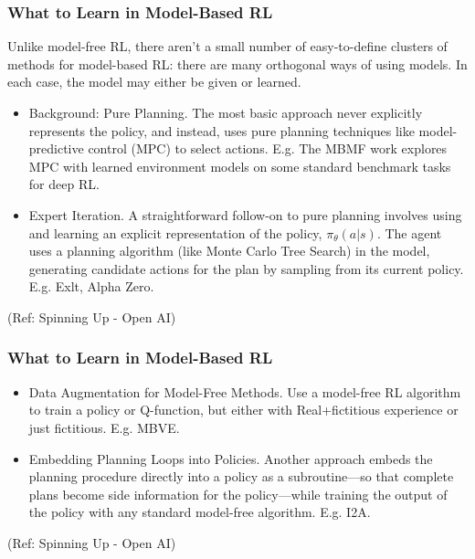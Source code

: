 \begin{frame}[fragile]\frametitle{What to Learn in Model-Based RL}

Unlike model-free RL, there aren't a small number of easy-to-define clusters of methods for model-based RL: there are many orthogonal ways of using models.  In each case, the model may either be given or learned.

\begin{itemize}
\item Background: Pure Planning. The most basic approach never explicitly represents the policy, and instead, uses pure planning techniques like model-predictive control (MPC) to select actions. E.g. The MBMF work explores MPC with learned environment models on some standard benchmark tasks for deep RL.
\item Expert Iteration. A straightforward follow-on to pure planning involves using and learning an explicit representation of the policy, $\pi_{\theta}(a|s)$. The agent uses a planning algorithm (like Monte Carlo Tree Search) in the model, generating candidate actions for the plan by sampling from its current policy. E.g. Exlt, Alpha Zero.
\end{itemize}

{\tiny (Ref: Spinning Up - Open AI)}
\end{frame}

\begin{frame}[fragile]\frametitle{What to Learn in Model-Based RL}


\begin{itemize}
\item Data Augmentation for Model-Free Methods. Use a model-free RL algorithm to train a policy or Q-function, but either with Real+fictitious experience or just fictitious. E.g. MBVE.
\item Embedding Planning Loops into Policies. Another approach embeds the planning procedure directly into a policy as a subroutine—so that complete plans become side information for the policy—while training the output of the policy with any standard model-free algorithm. E.g. I2A.
\end{itemize}

{\tiny (Ref: Spinning Up - Open AI)}
\end{frame}

